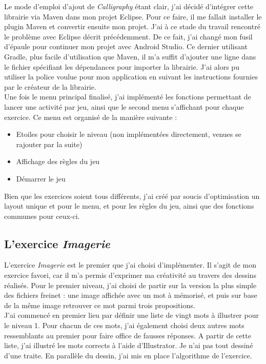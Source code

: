 Le mode d'emploi d'ajout de \textit{Calligraphy} étant clair, j'ai décidé d'intégrer cette librairie via Maven dans mon projet Eclipse. Pour ce faire, il me fallait installer le plugin Maven et convertir ensuite mon projet. J'ai à ce stade du travail rencontré le problème avec Eclipse décrit précédemment. De ce fait, j'ai changé mon fusil d'épaule pour continuer mon projet avec Android Studio. Ce dernier utilisant Gradle, plus facile d'utilisation que Maven, il m'a suffit d'ajouter une ligne dans le fichier spécifiant les dépendances pour importer la librairie. J'ai alors pu utiliser la police voulue pour mon application en suivant les instructions fournies par le créateur de la librairie.\\

Une fois le menu principal finalisé, j'ai implémenté les fonctions permettant de lancer une activité par jeu, ainsi que le second menu s'affichant pour chaque exercice. Ce menu est organisé de la manière suivante :
\begin{itemize}
\item Etoiles pour choisir le niveau (non implémentées directement, venues se rajouter par la suite)
\item Affichage des règles du jeu
\item Démarrer le jeu
\end{itemize}
Bien que les exercices soient tous différents, j'ai créé par soucis d'optimisation un layout unique et pour le menu, et pour les règles du jeu, ainsi que des fonctions communes pour ceux-ci.


\subsection{L'exercice \textit{Imagerie}}
L'exercice \textit{Imagerie} est le premier que j'ai choisi d'implémenter. Il s'agit de mon exercice favori, car il m'a permis d'exprimer ma créativité au travers des dessins réalisés. Pour le premier niveau, j'ai choisi de partir sur la version la plus simple des fichiers freinet : une image affichée avec un mot à mémorisé, et puis sur base de la même image retrouver ce mot parmi trois propositions.\\

J'ai commencé en premier lieu par définir une liste de vingt mots à illustrer pour le niveau 1. Pour chacun de ces mots, j'ai également choisi deux autres mots ressemblants au premier pour faire office de fausses réponses. A partir de cette liste, j'ai illustré les mots corrects à l'aide d'Illustrator. Je n'ai pas tout dessiné d'une traite. En parallèle du dessin, j'ai mis en place l'algorithme de l'exercice.\\

